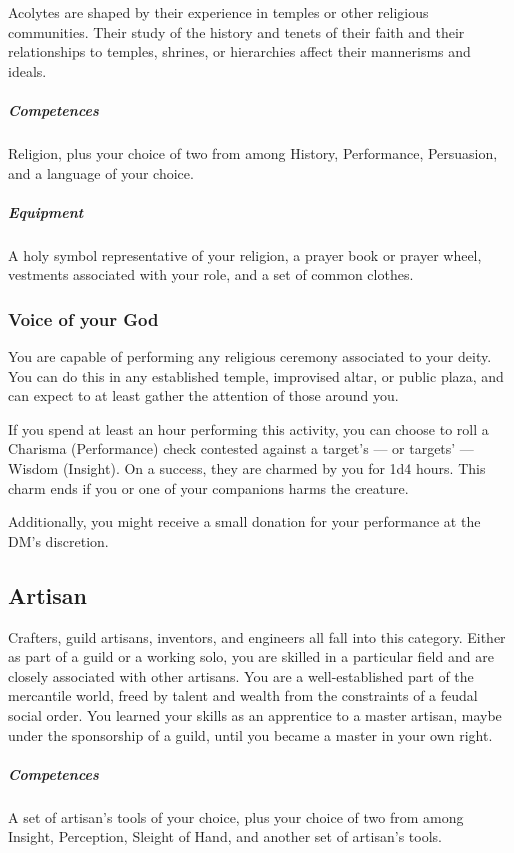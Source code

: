     Acolytes are shaped by their experience in temples or other religious communities.
    Their study of the history and tenets of their faith and their relationships to temples, shrines, or hierarchies affect their mannerisms and ideals.

    \subparagraph{Competences} Religion, plus your choice of two from among History, Performance, Persuasion, and a language of your choice.

    \subparagraph{Equipment} A holy symbol representative of your religion, a prayer book or prayer wheel, vestments associated with your role, and a set of common clothes.

    \subsubsection{Voice of your God} \label{feat::voiceofyourgod}
        You are capable of performing any religious ceremony associated to your deity.
        You can do this in any established temple, improvised altar, or public plaza, and can expect to at least gather the attention of those around you.

        If you spend at least an hour performing this activity, you can choose to roll a Charisma (Performance) check contested against a target's --- or targets' --- Wisdom (Insight).
        On a success, they are charmed by you for 1d4 hours.
        This charm ends if you or one of your companions harms the creature.

        Additionally, you might receive a small donation for your performance at the DM's discretion.

\pagebreak

\subsection*{Artisan} \label{ssec::artisan}
    Crafters, guild artisans, inventors, and engineers all fall into this category.
    Either as part of a guild or a working solo, you are skilled in a particular field and are closely associated with other artisans.
    You are a well-established part of the mercantile world, freed by talent and wealth from the constraints of a feudal social order.
    You learned your skills as an apprentice to a master artisan, maybe under the sponsorship of a guild, until you became a master in your own right.

    \subparagraph{Competences} A set of artisan's tools of your choice, plus your choice of two from among Insight, Perception, Sleight of Hand, and another set of artisan's tools.

